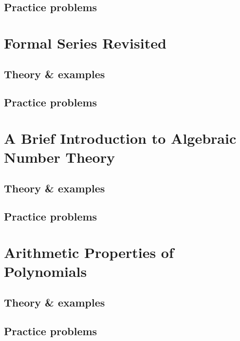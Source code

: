 \documentclass[oneside]{book}
\numberwithin{equation}{section}
\begin{document}
\subsection{Practice problems}


\section{Formal Series Revisited}

\subsection{Theory \& examples}

\subsection{Practice problems}


\section{A Brief Introduction to Algebraic Number Theory}

\subsection{Theory \& examples}

\subsection{Practice problems}


\section{Arithmetic Properties of Polynomials}

\subsection{Theory \& examples}

\subsection{Practice problems}
\end{document}
